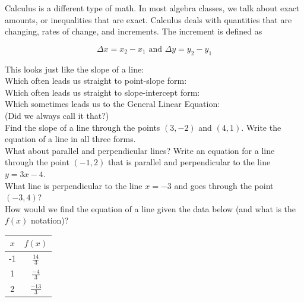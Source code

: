 \documentclass[11pt]{article}
\begin{document}
    \noindent Calculus is a different type of math. In most algebra classes, we talk about exact amounts, or inequalities that are exact. Calculus deals with quantities that are changing, rates of change, and increments. The increment is defined as

    \[\Delta x = x_2 - x_1 \text{ and } \Delta y = y_2 - y_1\]

    \noindent This looks just like the slope of a line:\\[2ex]

    \noindent Which often leads us straight to point-slope form:\\[2ex]

    \noindent Which often leads us straight to slope-intercept form:\\[2ex]

    \noindent Which sometimes leads us to the General Linear Equation:\\[2ex]

    \noindent (Did we always call it that?)\\[2ex]

    \noindent Find the slope of a line through the points $\displaystyle (3,-2)$ and $\displaystyle (4,1)$. Write the equation of a line in all three forms.\\[2ex]

    \noindent What about parallel and perpendicular lines? Write an equation for a line through the point $\displaystyle (-1,2)$ that is parallel and perpendicular to the line $\displaystyle y=3x-4$.\\[2ex]

    \noindent What line is perpendicular to the line $\displaystyle x=-3$ and goes through the point $\displaystyle (-3,4)$?\\[2ex]

    \noindent How would we find the equation of a line given the data below (and what is the $\displaystyle f(x)$ notation)?\\[1ex]

    \begin{tabular}{ |c|c| }
        \hline
        $\displaystyle x$ & $\displaystyle f(x)$          \\
        \hline
        -1                & $\displaystyle \frac{14}{3}$  \\
        1                 & $\displaystyle \frac{-4}{3}$  \\
        2                 & $\displaystyle \frac{-13}{3}$ \\
        \hline
    \end{tabular}\\[2ex]
\end{document}
